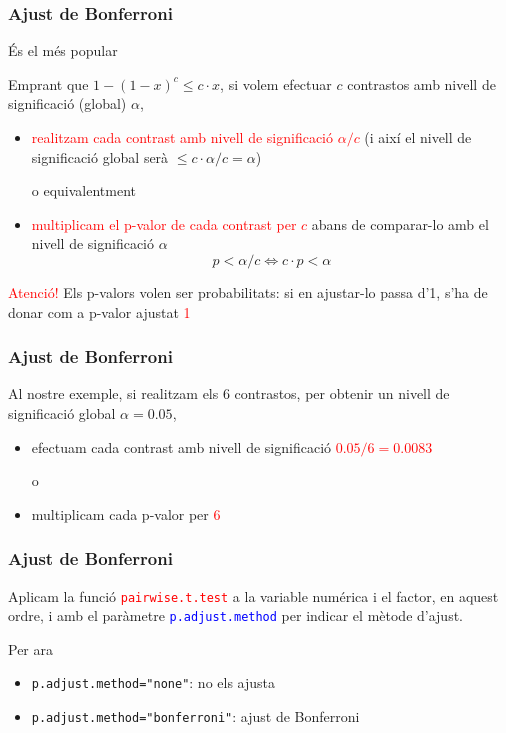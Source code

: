 \documentclass[12pt,t]{beamer}
\newcommand{\red}[1]{\textcolor{red}{#1}}
\newcommand{\blue}[1]{\textcolor{blue}{#1}}
\renewcommand{\leq}{\leqslant}
\theoremstyle{plain}
\theoremstyle{definition}
\begin{document}
\begin{frame}
\frametitle{Ajust de Bonferroni} 

És el més popular\medskip

Emprant que $1-(1-x)^c \leq c\cdot x$, si volem efectuar $c$ contrastos amb nivell de significació (global) $\alpha$, 
\begin{itemize}
\item \red{realitzam cada contrast amb nivell de significació $\alpha/c$} (i així el nivell de significació 
global serà $\leq c\cdot \alpha/c=\alpha$)\medskip

o equivalentment\medskip

\item \red{multiplicam el p-valor de cada contrast per $c$}
abans de comparar-lo amb el nivell de significació $\alpha$
$$
p<\alpha/c \Longleftrightarrow c\cdot p<\alpha
$$
\end{itemize}\pause\medskip

\red{Atenció!} Els p-valors volen ser probabilitats: si en ajustar-lo  passa d'1, s'ha de donar com a p-valor ajustat \red{1}
\end{frame}


\begin{frame}
\frametitle{Ajust de Bonferroni} 

Al nostre exemple, si realitzam els  6 contrastos, per obtenir un nivell de significació global  $\alpha =0.05$,\medskip

\begin{itemize}
\item  efectuam cada contrast amb nivell de significació
\red{$0.05/6=0.0083$} \medskip

o \medskip

\item multiplicam cada p-valor per \red{6}
\end{itemize}

\end{frame}



\begin{frame}[fragile]
\frametitle{Ajust de Bonferroni} 

Aplicam la funció \red{\texttt{pairwise.t.test}} a la variable numérica i el factor, en aquest ordre, i amb el paràmetre \blue{\texttt{p.adjust.method}} per indicar el mètode d'ajust.\medskip

Per ara
\begin{itemize}
\item \texttt{p.adjust.method="none"}: no els ajusta
\item \texttt{p.adjust.method="bonferroni"}: ajust de Bonferroni
\end{itemize}

\end{frame}
\end{document}
